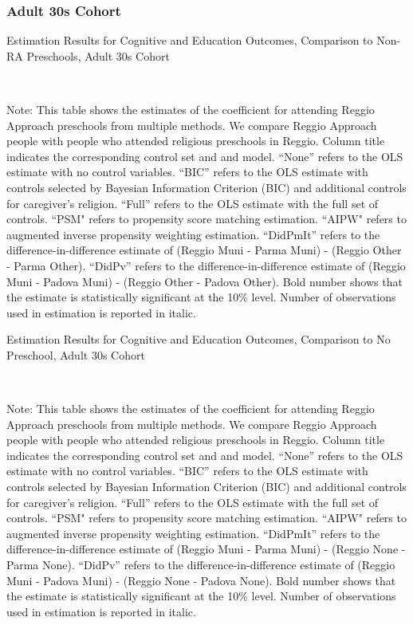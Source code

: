 \subsubsection{Adult 30s Cohort}
\begin{table}[H] \caption{Estimation Results for Cognitive and Education Outcomes, Comparison to Non-RA Preschools, Adult 30s Cohort} \label{ols-CN-adult30-reg-other}
\scalebox{0.8}{}
\vspace{1ex} \\
\footnotesize\raggedright{Note: This table shows the estimates of the coefficient for attending Reggio Approach preschools from multiple methods. We compare Reggio Approach people with people who attended religious preschools in Reggio. Column title indicates the corresponding control set and and model. ``None'' refers to the OLS estimate with no control variables. ``BIC'' refers to the OLS estimate with controls selected by Bayesian Information Criterion (BIC) and additional controls for caregiver's religion. ``Full'' refers to the OLS estimate with the full set of controls. ``PSM" refers to propensity score matching estimation. ``AIPW" refers to augmented inverse propensity weighting estimation. ``DidPmIt'' refers to the difference-in-difference estimate of (Reggio Muni - Parma Muni) - (Reggio Other - Parma Other). ``DidPv'' refers to the difference-in-difference estimate of (Reggio Muni - Padova Muni) - (Reggio Other - Padova Other). Bold number shows that the estimate is statistically significant at the 10\% level. Number of observations used in estimation is reported in italic.}
\end{table}

\begin{table}[H] \caption{Estimation Results for Cognitive and Education Outcomes, Comparison to No Preschool, Adult 30s Cohort} \label{ols-CN-adult30-reg-none}
\scalebox{0.8}{}
\vspace{1ex} \\
\footnotesize\raggedright{Note: This table shows the estimates of the coefficient for attending Reggio Approach preschools from multiple methods. We compare Reggio Approach people with people who attended religious preschools in Reggio. Column title indicates the corresponding control set and and model. ``None'' refers to the OLS estimate with no control variables. ``BIC'' refers to the OLS estimate with controls selected by Bayesian Information Criterion (BIC) and additional controls for caregiver's religion. ``Full'' refers to the OLS estimate with the full set of controls. ``PSM" refers to propensity score matching estimation. ``AIPW" refers to augmented inverse propensity weighting estimation. ``DidPmIt'' refers to the difference-in-difference estimate of (Reggio Muni - Parma Muni) - (Reggio None - Parma None). ``DidPv'' refers to the difference-in-difference estimate of (Reggio Muni - Padova Muni) - (Reggio None - Padova None). Bold number shows that the estimate is statistically significant at the 10\% level. Number of observations used in estimation is reported in italic.}
\end{table}


